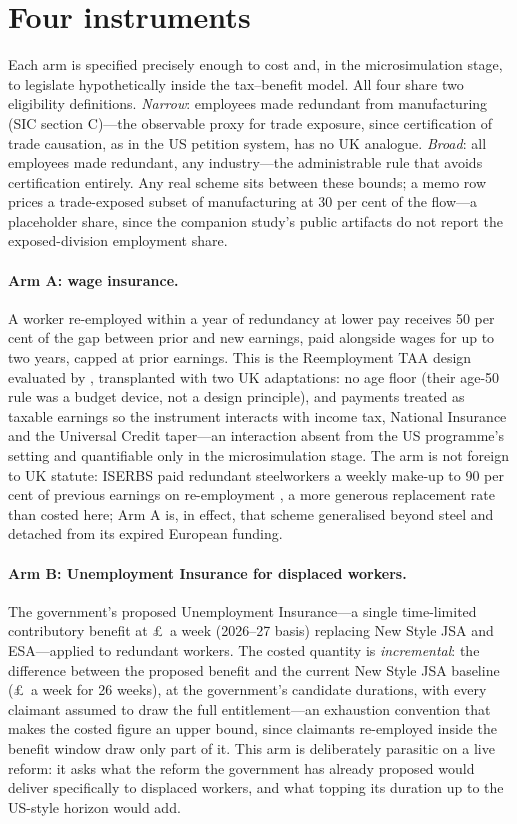 \section{Four instruments}\label{sec:design}

Each arm is specified precisely enough to cost and, in the
microsimulation stage, to legislate hypothetically inside the tax--benefit
model. All four share two eligibility definitions. \emph{Narrow}:
employees made redundant from manufacturing (SIC section C)---the
observable proxy for trade exposure, since certification of trade
causation, as in the US petition system, has no UK analogue.
\emph{Broad}: all employees made redundant, any industry---the
administrable rule that avoids certification entirely. Any real scheme
sits between these bounds; a memo row prices a trade-exposed subset of
manufacturing at 30 per cent of the flow---a placeholder share, since
the companion study's public artifacts do not report the exposed-division
employment share.

\paragraph{Arm A: wage insurance.} A worker re-employed within a year of
redundancy at lower pay receives 50 per cent of
the gap between prior and new earnings, paid alongside wages for up to
two years, capped at prior earnings. This is the Reemployment TAA design
evaluated by \citet{hyman2024}, transplanted with two UK adaptations: no
age floor (their age-50 rule was a budget device, not a design
principle), and payments treated as taxable earnings so the instrument
interacts with income tax, National Insurance and the Universal Credit
taper---an interaction absent from the US programme's setting and
quantifiable only in the microsimulation stage. The arm is not foreign to
UK statute: ISERBS paid redundant steelworkers a weekly make-up to 90 per
cent of previous earnings on re-employment \citep{iserbs1988}, a more
generous replacement rate than costed here; Arm A is, in effect, that
scheme generalised beyond steel and detached from its expired European
funding.

\paragraph{Arm B: Unemployment Insurance for displaced workers.} The
government's proposed Unemployment Insurance---a single time-limited
contributory benefit at \pounds\TaaUiWeekly\ a week (2026--27 basis) replacing New
Style JSA and ESA---applied to redundant workers. The costed quantity is
\emph{incremental}: the difference between the proposed benefit and the
current New Style JSA baseline (\pounds\TaaJsaWeekly\ a week for 26
weeks), at the government's candidate durations, with every claimant assumed to
draw the full entitlement---an exhaustion convention that makes the
costed figure an upper bound, since claimants re-employed inside the
benefit window draw only part of it. This arm is deliberately
parasitic on a live reform: it asks what the reform the government has
already proposed would deliver specifically to displaced workers, and
what topping its duration up to the US-style horizon would add.

